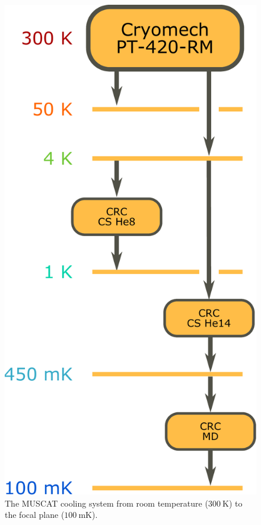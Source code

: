 \documentclass{spie}
\begin{document}
\begin{figure}[tb]
\centering
\includegraphics[height=0.4\textheight]{MUSCAT_coolingChain_PT420}
\caption{The MUSCAT cooling system from room temperature ($300~\si{\kelvin}$) to the focal plane ($100~\si{\milli\kelvin}$).}\label{fig:coolingChain}
\end{figure}
\end{document}
